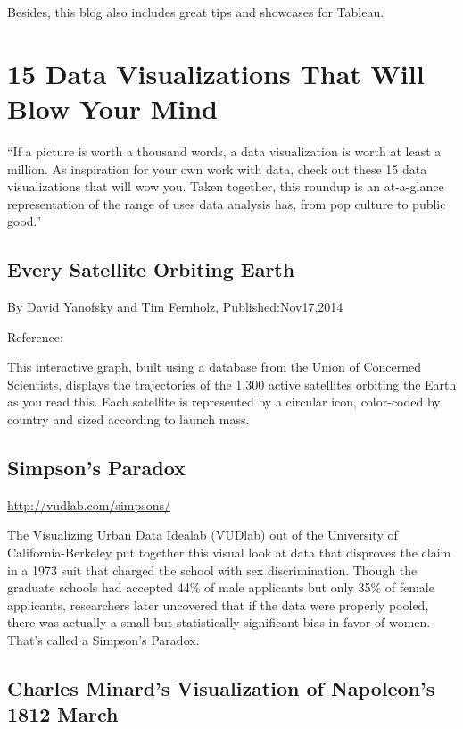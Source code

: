 \documentclass[]{book}
\theoremstyle{definition}
\theoremstyle{definition}
\theoremstyle{definition}
\theoremstyle{remark}
\begin{document}
Besides, this blog also includes great tips and showcases for Tableau.

\section{15 Data Visualizations That Will Blow Your
Mind}\label{data-visualizations-that-will-blow-your-mind}

\citep{15_mindblowing}

``If a picture is worth a thousand words, a data visualization is worth
at least a million. As inspiration for your own work with data, check
out these 15 data visualizations that will wow you. Taken together, this
roundup is an at-a-glance representation of the range of uses data
analysis has, from pop culture to public good.''

\subsection{Every Satellite Orbiting
Earth}\label{every-satellite-orbiting-earth}

By David Yanofsky and Tim Fernholz, Published:Nov17,2014

Reference: \citep{Satellite}

This interactive graph, built using a database from the Union of
Concerned Scientists, displays the trajectories of the 1,300 active
satellites orbiting the Earth as you read this. Each satellite is
represented by a circular icon, color-coded by country and sized
according to launch mass.

\subsection{Simpson's Paradox}\label{simpsons-paradox}

\url{http://vudlab.com/simpsons/}

The Visualizing Urban Data Idealab (VUDlab) out of the University of
California-Berkeley put together this visual look at data that disproves
the claim in a 1973 suit that charged the school with sex
discrimination. Though the graduate schools had accepted 44\% of male
applicants but only 35\% of female applicants, researchers later
uncovered that if the data were properly pooled, there was actually a
small but statistically significant bias in favor of women. That's
called a Simpson's Paradox.

\subsection{Charles Minard's Visualization of Napoleon's 1812
March}\label{charles-minards-visualization-of-napoleons-1812-march}
\end{document}
